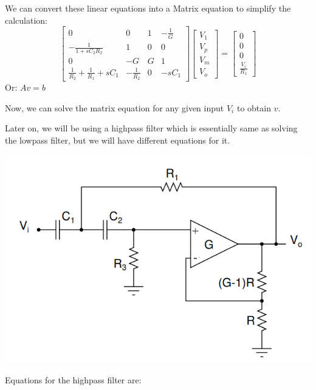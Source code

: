 \documentclass[12pt]{article}
\begin{document}
We can convert these linear equations into a Matrix equation to simplify the calculation:
\begin{equation}
\begin{bmatrix}
    0 & 0 & 1 & -\frac{1}{G} \\
    -\frac{1}{1+s C_2 R_2} & 1 & 0 & 0 \\
    0 & -G & G & 1 \\
    \frac{1}{R_2}+\frac{1}{R_1}+sC_1 & -\frac{1}{R_2} & 0 & -s C_1
\end{bmatrix}
\begin{bmatrix}
    V_1 \\
    V_p \\
    V_m \\
    V_o
\end{bmatrix}
=
\begin{bmatrix}
    0 \\
    0 \\
    0 \\
    \frac{V_i}{R_1}
\end{bmatrix}
\end{equation}
Or: $Av = b$

Now, we can solve the matrix equation for any given input $V_i$ to obtain $v$.

Later on, we will be using a highpass filter which is essentially same as solving the lowpass filter, but we will have different equations for it.

\begin{center}
    \includegraphics[scale=1]{images/ckt2.png}
\end{center}

Equations for the highpass filter are:
\end{document}
